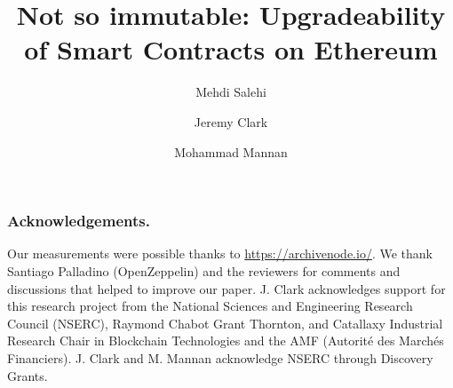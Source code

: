\documentclass[envcountsect]{llncs}
\begin{document}
\frontmatter
\mainmatter

\title{Not so immutable: Upgradeability of Smart Contracts on Ethereum}

\author{Mehdi Salehi \and Jeremy Clark \and Mohammad Mannan}

\maketitle







%
%



\subsubsection*{Acknowledgements.} Our measurements were possible thanks to \url{https://archivenode.io/}. We thank Santiago Palladino (OpenZeppelin) and the reviewers for comments and discussions that helped to improve our paper. J. Clark acknowledges support for this research project from the National Sciences and Engineering Research Council (NSERC), Raymond Chabot Grant Thornton, and Catallaxy Industrial Research Chair in Blockchain Technologies and the AMF (Autorité des Marchés Financiers). J. Clark and M. Mannan acknowledge NSERC through Discovery Grants. 






\clearpage
\appendix




\end{document}

